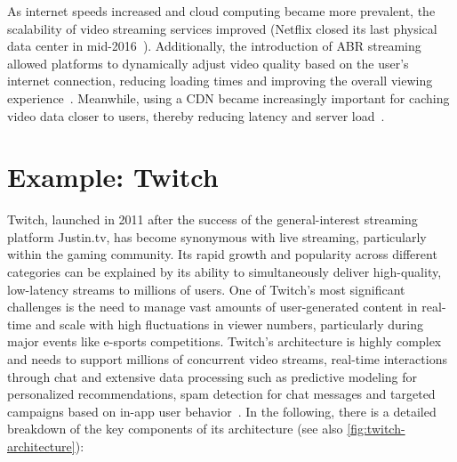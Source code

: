 As internet speeds increased and cloud computing became more prevalent, the scalability of video streaming services improved (Netflix closed its last physical data center in mid-2016~\parencite{netflix_cloud}).
Additionally, the introduction of \ac{ABR} streaming allowed platforms to dynamically adjust video quality based on the user's internet connection, reducing loading times and improving the overall viewing experience~\parencite{abr}. Meanwhile, using a \ac{CDN} became increasingly important for caching video data closer to users, thereby reducing latency and server load~\parencite{cdn_basic}.

\section{Example: Twitch}
Twitch, launched in 2011 after the success of the general-interest streaming platform Justin.tv, has become synonymous with live streaming, particularly within the gaming community. Its rapid growth and popularity across different categories can be explained by its ability to simultaneously deliver high-quality, low-latency streams to millions of users. 
One of Twitch's most significant challenges is the need to manage vast amounts of user-generated content in real-time and scale with high fluctuations in viewer numbers, particularly during major events like e-sports competitions.
Twitch's architecture is highly complex and needs to support millions of concurrent video streams, real-time interactions through chat and extensive data processing such as predictive modeling for personalized recommendations, spam detection for chat messages and targeted campaigns based on in-app user behavior~\parencite{twitch_analytics}. In the following, there is a detailed breakdown of the key components of its architecture (see also \autoref{fig:twitch-architecture}):

